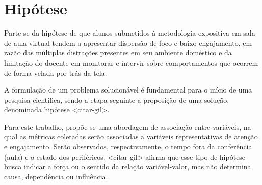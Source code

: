 \section{Hipótese}
Parte-se da hipótese de que alunos submetidos à metodologia expositiva em sala de aula virtual tendem a apresentar dispersão de foco e baixo engajamento, em razão das múltiplas distrações presentes em seu ambiente doméstico e da limitação do docente em monitorar e intervir sobre comportamentos que ocorrem de forma velada por trás da tela.

A formulação de um problema solucionável é fundamental para o início de uma pesquisa científica, sendo a etapa seguinte a proposição de uma solução, denominada hipótese <citar-gil>.

Para este trabalho, propõe-se uma abordagem de associação entre variáveis, na qual as métricas coletadas serão associadas a variáveis representativas de atenção e engajamento. Serão observados, respectivamente, o tempo fora da conferência (aula) e o estado dos periféricos. <citar-gil> afirma que esse tipo de hipótese busca indicar a força ou o sentido da relação variável-valor, mas não determina causa, dependência ou influência.